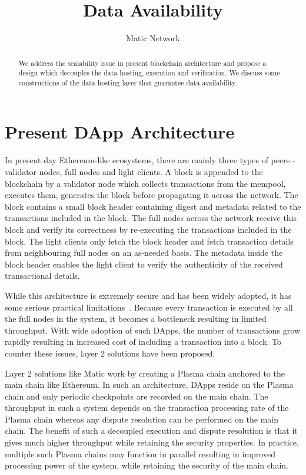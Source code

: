 \documentclass[sigconf, screen=true, nonacm]{acmart}
\begin{document}
\title{Data Availability}
\author{Matic Network \vspace{1cm}}

\begin{abstract}
    We address the scalability issue in present blockchain architecture and propose a design which decouples the data hosting, execution and verification. We discuss some constructions of the data hosting layer that guarantee data availability.
\end{abstract}

\maketitle


\section{Present DApp Architecture}
    In present day Ethereum-like ecosystems, there are mainly three types of peers - validator nodes, full nodes and light clients. A block is appended to the blockchain by a validator node which collects transactions from the mempool, executes them, generates the block before propagating it across the network. The block contains a small block header containing digest and metadata related to the transactions included in the block. The full nodes across the network receive this block and verify its correctness by re-executing the transactions included in the block. The light clients only fetch the block header and fetch transaction details from neighbouring full nodes on an as-needed basis. The metadata inside the block header enables the light client to verify the authenticity of the received transactional details. 

    While this architecture is extremely secure and has been widely adopted, it has some serious practical limitations~\cite{Stanford:2020}. Because every transaction is executed by all the full nodes in the system, it becomes a bottleneck resulting in limited throughput. With wide adoption of such DApps, the number of transactions grow rapidly resulting in increased cost of including a transaction into a block. To counter these issues, layer 2 solutions have been proposed. 

    Layer 2 solutions like Matic work by creating a Plasma chain anchored to the main chain like Ethereum. In such an architecture, DApps reside on the Plasma chain and only periodic checkpoints are recorded on the main chain. The throughput in such a system depends on the transaction processing rate of the Plasma chain whereas any dispute resolution can be performed on the main chain. The benefit of such a decoupled execution and dispute resolution is that it gives much higher throughput while retaining the security properties. In practice, multiple such Plasma chains may function in parallel resulting in improved processing power of the system, while retaining the security of the main chain. 
\end{document}
